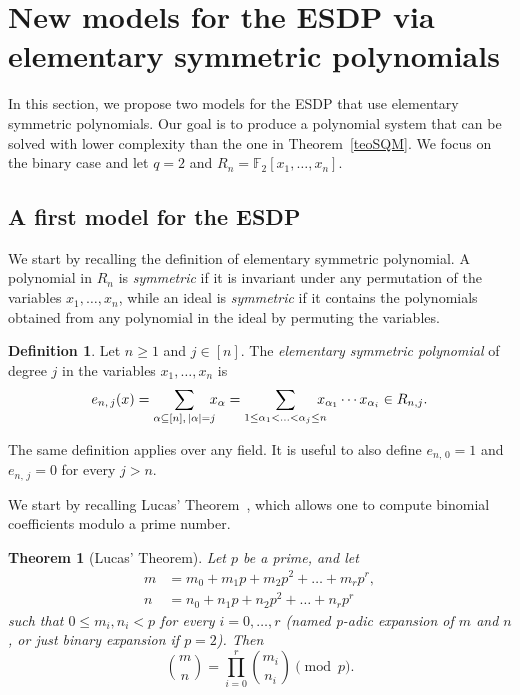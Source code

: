 \documentclass[11pt]{article}
\newcommand{\F}[0]{\mathbb{F}}
\newcommand{\es}[2]{e_{#1,\, #2}}
\theoremstyle{plain}
\newtheorem{theo}{Theorem}[section]
\theoremstyle{definition}
\newtheorem{defin}{Definition}[section]
\theoremstyle{remark}
\begin{document}
\section{New models for the ESDP via elementary symmetric polynomials}\label{secCore}

In this section, we propose two models for the ESDP that use elementary symmetric polynomials. Our goal is to produce a polynomial system that can be solved with lower complexity than the one in Theorem~\ref{teoSQM}. We focus on the binary case and let $q=2$ and $R_n=\F_2[x_1,\dots,x_n]$.

\subsection{A first model for the ESDP}\label{secFirstModel}

We start by recalling the definition of elementary symmetric polynomial. A polynomial in $R_n$ is \textit{symmetric} if it is invariant under any permutation of the variables $x_1,\ldots,x_n$, while an ideal is \textit{symmetric} if it contains the polynomials obtained from any polynomial in the ideal by permuting the variables. 
\begin{defin}
    Let $n\geq 1$ and $j\in[n]$. The \textit{elementary symmetric polynomial} of degree $j$ in the variables $x_1,\dots,x_n$ is
    \begin{equation*}
        \es{n}{j}(x) = \sum_{\alpha\subseteq[n],\,|\alpha|=j}\hspace{-0.2cm}x_\alpha
        =\sum_{1\leq\alpha_1<\ldots<\alpha_j\leq n}\hspace{-0.3cm}x_{\alpha_1}\cdots x_{\alpha_i}\in R_{n,j}.
    \end{equation*}
\end{defin}
The same definition applies over any field. It is useful to also define $\es{n}{0}=1$ and $\es{n}{j}=0$ for every $j>n$. %

We start by recalling Lucas' Theorem~\cite[417-420]{lucas1891theoriedesnombres}, which allows one to compute binomial coefficients modulo a prime number.

\begin{theo}[Lucas' Theorem]\label{thm:lucas}
    Let $p$ be a prime, and let
    \begin{align*}
        m &= m_0 + m_1p + m_2p^2 + \dots + m_rp^r,\\
        n &= n_0 + n_1p + n_2p^2 + \dots + n_rp^r
    \end{align*}
    such that $0\leq m_i, n_i < p$ for every $i=0,\dots,r$ (named \textnormal{p-adic expansion} of $m$ and $n$, or just \textnormal{binary expansion} if $p=2$). Then
    \begin{equation*}
        \binom{m}{n} = \prod_{i=0}^r \binom{m_i}{n_i}\pmod{p}.
    \end{equation*}
\end{theo}
\end{document}
